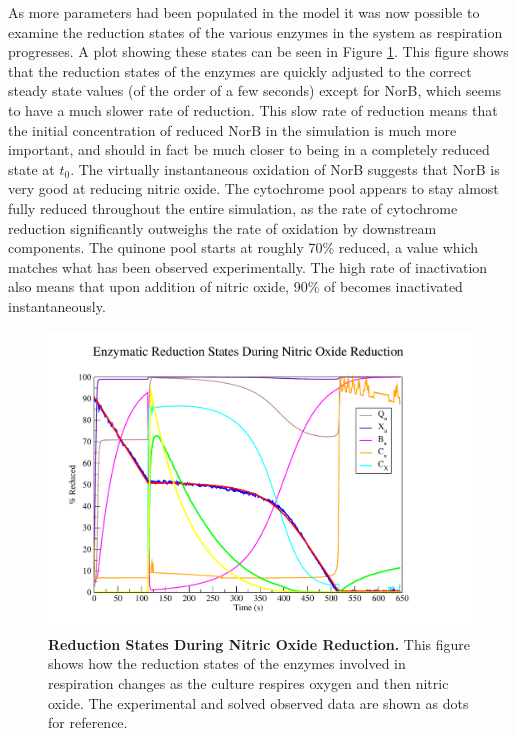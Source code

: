 As more parameters had been populated in the model it was now possible to examine the reduction states of the various enzymes in the system as respiration progresses. A plot showing these states can be seen in Figure \ref{fig:nosimredox}. This figure shows that the reduction states of the enzymes are quickly adjusted to the correct steady state values (of the order of a few seconds) except for NorB, which seems to have a much slower rate of reduction. This slow rate of reduction means that the initial concentration of reduced NorB in the simulation is much more important, and should in fact be much closer to being in a completely reduced state at $t_0$. The virtually instantaneous oxidation of NorB suggests that NorB is very good at reducing nitric oxide. The cytochrome pool appears to stay almost fully reduced throughout the entire simulation, as the rate of cytochrome reduction significantly outweighs the rate of oxidation by downstream components. The quinone pool starts at roughly 70\% reduced, a value which matches what has been observed experimentally. The high rate of \cbbthree{} inactivation also means that upon addition of nitric oxide, 90\% of \cbbthree{} becomes inactivated instantaneously.

\begin{figure}[tbp]
 \centering
 \includegraphics[width=15cm, trim=1cm 1cm 3cm 1cm, clip=true]{./06-noreduction/data/aer-no-sim-redox.pdf}
 \caption[{Reduction States During Nitric Oxide Reduction.}]{{\bf Reduction States During Nitric Oxide Reduction.} This figure shows how the reduction states of the enzymes involved in respiration changes as the culture respires oxygen and then nitric oxide. The experimental and solved observed data are shown as dots for reference.}
 \label{fig:nosimredox}
\end{figure}

